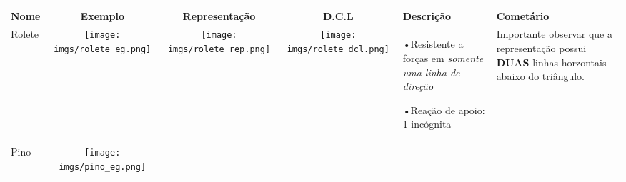 \documentclass{article}
\begin{document}
            \begin{table}[h]
                \begin{tabular}{|l|c|c|c|l|l|}\hline
                    \textbf{Nome} & \textbf{Exemplo} & \textbf{Representação} & \textbf{D.C.L} & \textbf{Descrição} & \textbf{Cometário} \\ \hline

                    Rolete & 

                        \begin{minipage}{.2\textwidth}
                            \centering
                            \texttt{[image: imgs/rolete\_eg.png]}
                        \end{minipage} &

                        \begin{minipage}{.2\columnwidth}
                            \centering
                            \texttt{[image: imgs/rolete\_rep.png]}
                        \end{minipage} &

                        \begin{minipage}{.2\columnwidth}
                            \centering
                            \texttt{[image: imgs/rolete\_dcl.png]}
                        \end{minipage} &

                        \begin{minipage}{.1\columnwidth}
                            \tiny
                            •Resistente a forças em \emph{somente uma linha de direção}

                                •Reação de apoio: 1 incógnita
                        \end{minipage}&

                        \begin{minipage}{.1\columnwidth}
                            \vspace{5px}
                            \tiny
                            Importante observar que a representação possui \textbf{DUAS} linhas horzontais abaixo do triângulo.
                            \vspace{5px}
                        \end{minipage} \\ \hline

                    Pino & 

                        \begin{minipage}{.2\textwidth}
                            \centering
                            \texttt{[image: imgs/pino\_eg.png]}
                        \end{minipage} &


\end{tabular}
\end{table}
\end{document}
